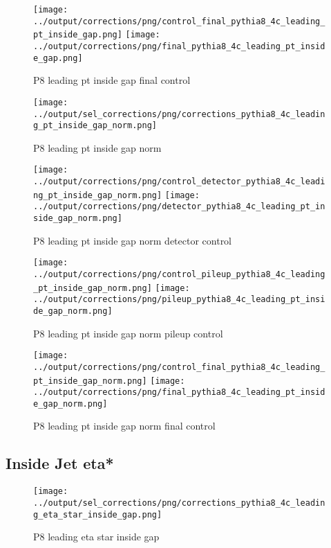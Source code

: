\documentclass[11pt]{book}
\begin{document}
\begin{figure}[ht]
\centering
\texttt{[image: ../output/corrections/png/control\_final\_pythia8\_4c\_leading\_pt\_inside\_gap.png]}
\texttt{[image: ../output/corrections/png/final\_pythia8\_4c\_leading\_pt\_inside\_gap.png]}
\caption{P8 leading pt inside gap final control}
\label{fig:p8_leading_pt_inside_gap_final_control}
\end{figure}



\begin{figure}[ht]
\centering
\texttt{[image: ../output/sel\_corrections/png/corrections\_pythia8\_4c\_leading\_pt\_inside\_gap\_norm.png]}
\caption{P8 leading pt inside gap norm}
\label{fig:p8_leading_pt_inside_gap_norm}
\end{figure}

\begin{figure}[ht]
\centering
\texttt{[image: ../output/corrections/png/control\_detector\_pythia8\_4c\_leading\_pt\_inside\_gap\_norm.png]}
\texttt{[image: ../output/corrections/png/detector\_pythia8\_4c\_leading\_pt\_inside\_gap\_norm.png]}
\caption{P8 leading pt inside gap norm detector control}
\label{fig:p8_leading_pt_inside_gap_norm_detector_control}
\end{figure}

\begin{figure}[ht]
\centering
\texttt{[image: ../output/corrections/png/control\_pileup\_pythia8\_4c\_leading\_pt\_inside\_gap\_norm.png]}
\texttt{[image: ../output/corrections/png/pileup\_pythia8\_4c\_leading\_pt\_inside\_gap\_norm.png]}
\caption{P8 leading pt inside gap norm pileup control}
\label{fig:p8_leading_pt_inside_gap_norm_pileup_control}
\end{figure}


\begin{figure}[ht]
\centering
\texttt{[image: ../output/corrections/png/control\_final\_pythia8\_4c\_leading\_pt\_inside\_gap\_norm.png]}
\texttt{[image: ../output/corrections/png/final\_pythia8\_4c\_leading\_pt\_inside\_gap\_norm.png]}
\caption{P8 leading pt inside gap norm final control}
\label{fig:p8_leading_pt_inside_gap_norm_final_control}
\end{figure}



\clearpage
\subsection{Inside Jet eta*}
\begin{figure}[ht]
\centering
\texttt{[image: ../output/sel\_corrections/png/corrections\_pythia8\_4c\_leading\_eta\_star\_inside\_gap.png]}
\caption{P8 leading eta star inside gap}
\label{fig:p8_leading_eta_star_inside_gap}
\end{figure}
\end{document}
